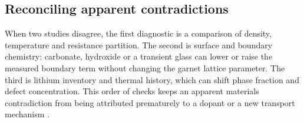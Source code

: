 \subsection{Reconciling apparent contradictions}

When two studies disagree, the first diagnostic is a comparison of density, temperature and resistance partition. The second is surface and boundary chemistry: carbonate, hydroxide or a transient glass can lower or raise the measured boundary term without changing the garnet lattice parameter. The third is lithium inventory and thermal history, which can shift phase fraction and defect concentration. This order of checks keeps an apparent materials contradiction from being attributed prematurely to a dopant or a new transport mechanism \cite{shi2025li2co3,zhang2023on,moy2025irreversible,li2026structure}.
